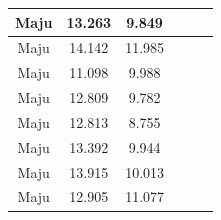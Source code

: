 \begin{longtable}{|c|c|c|c|c|c|}
  Maju           & 13.263              & 9.849            \\ \hline
  Maju           & 14.142              & 11.985           \\ \hline
  Maju           & 11.098              & 9.988            \\ \hline
  Maju           & 12.809              & 9.782            \\ \hline
  Maju           & 12.813              & 8.755            \\ \hline
  Maju           & 13.392              & 9.944            \\ \hline
  Maju           & 13.915              & 10.013           \\ \hline
  Maju           & 12.905              & 11.077           \\ \hline
\end{longtable}

